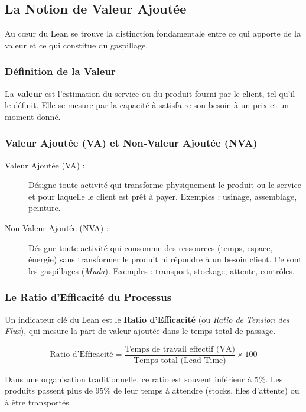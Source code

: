 \documentclass[a4paper,12pt]{article}
\begin{document}
\subsection{La Notion de Valeur Ajoutée}

Au cœur du Lean se trouve la distinction fondamentale entre ce qui apporte de la valeur et ce qui constitue du gaspillage.

\subsubsection{Définition de la Valeur}

La \textbf{valeur} est l'estimation du service ou du produit fourni par le client, tel qu'il le définit. Elle se mesure par la capacité à satisfaire son besoin à un prix et un moment donné.

\subsubsection{Valeur Ajoutée (VA) et Non-Valeur Ajoutée (NVA)}

\begin{description}
    \item[Valeur Ajoutée (VA) :] Désigne toute activité qui transforme physiquement le produit ou le service et pour laquelle le client est prêt à payer. Exemples : usinage, assemblage, peinture.
    \item[Non-Valeur Ajoutée (NVA) :] Désigne toute activité qui consomme des ressources (temps, espace, énergie) sans transformer le produit ni répondre à un besoin client. Ce sont les gaspillages (\textit{Muda}). Exemples : transport, stockage, attente, contrôles.
\end{description}

\subsubsection{Le Ratio d'Efficacité du Processus}

Un indicateur clé du Lean est le \textbf{Ratio d'Efficacité} (ou \textit{Ratio de Tension des Flux}), qui mesure la part de valeur ajoutée dans le temps total de passage.

\[
\text{Ratio d'Efficacité} = \frac{\text{Temps de travail effectif (VA)}}{\text{Temps total (Lead Time)}} \times 100
\]

Dans une organisation traditionnelle, ce ratio est souvent inférieur à 5\%. Les produits passent plus de 95\% de leur temps à attendre (stocks, files d'attente) ou à être transportés.
\end{document}
